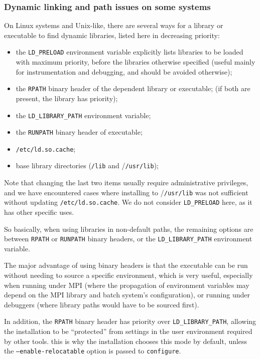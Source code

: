 \documentclass[a4paper,10pt,twoside]{csshortdoc}
\begin{document}
\subsubsection{Dynamic linking and path issues on some systems}

On Linux systems and Unix-like, there are several ways for a library or executable
to find dynamic libraries, listed here in decreasing priority:

\begin{itemize}
\item the \texttt{LD\_PRELOAD} environment variable explicitly lists
      libraries to be loaded with maximum priority, before the libraries
      otherwise specified (useful mainly for instrumentation
      and debugging, and should be avoided otherwise);
\item the \texttt{RPATH} binary header of the dependent library or executable;
      (if both are present, the library has priority);
\item the \texttt{LD\_LIBRARY\_PATH} environment variable;
\item the \texttt{RUNPATH} binary header of executable;
\item \texttt{/etc/ld.so.cache};
\item base library directories (\texttt{/lib} and /\texttt{/usr/lib});
\end{itemize}

Note that changing the last two items usually require administrative privileges,
and we have encountered cases where installing to /\texttt{/usr/lib} was not
sufficient without updating \texttt{/etc/ld.so.cache}. We do not consider
\texttt{LD\_PRELOAD} here, as it has other specific uses.

So basically, when using libraries in non-default paths, the remaining
options are between \texttt{RPATH} or \texttt{RUNPATH} binary headers, or the
\texttt{LD\_LIBRARY\_PATH} environment variable.

The major advantage of using binary headers is that the executable
can be run without needing to source a specific environment, which
is very useful, especially when running under MPI (where the propagation
of environment variables may depend on the MPI library and batch system's
configuration), or running under debuggers (where library paths would have
to be sourced first).

In addition, the \texttt{RPATH} binary header has priority over
\texttt{LD\_LIBRARY\_PATH}, allowing the installation to be ``protected''
from settings in the user environment required by other tools.
this is why the \CS installation chooses this mode by default,
unless the \texttt{--enable-relocatable} option is passed to
{\tt configure}.
\end{document}
